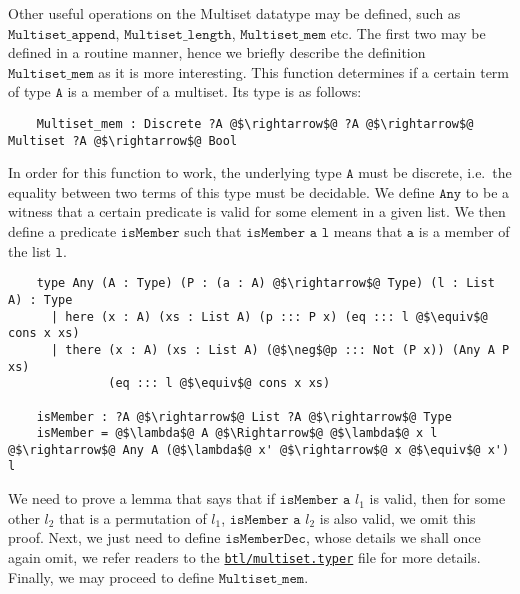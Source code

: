 \documentclass[12pt,twoside,maitrise]{dms}
\theoremstyle{definition}
\numberwithin{equation}{section}
\numberwithin{table}{chapter}
\numberwithin{figure}{chapter}
\newcommand\id[1] {\texttt{#1}}
\newcommand\fn[1] {\texttt{#1}}
\begin{document}
Other useful operations on the Multiset datatype may be defined, such as
$\fn{Multiset\_append}$, $\fn{Multiset\_length}$, $\fn{Multiset\_mem}$ etc. The
first two may be defined in a routine manner, hence we briefly describe the
definition $\fn{Multiset\_mem}$ as it is more interesting. This function
determines if a certain term of type $\fn{A}$ is a member of a multiset. Its
type is as follows:

\begin{verbatim}
    Multiset_mem : Discrete ?A @$\rightarrow$@ ?A @$\rightarrow$@ Multiset ?A @$\rightarrow$@ Bool
\end{verbatim}

In order for this function to work, the underlying type $\fn{A}$ must be
discrete, i.e.\ the equality between two terms of this type must be decidable.
We define $\fn{Any}$ to be a witness that a certain predicate is valid for some
element in a given list. We then define a predicate $\fn{isMember}$ such that
$\fn{isMember a l}$ means that $\fn{a}$ is a member of the list $\fn{l}$.

\begin{verbatim}
    type Any (A : Type) (P : (a : A) @$\rightarrow$@ Type) (l : List A) : Type
      | here (x : A) (xs : List A) (p ::: P x) (eq ::: l @$\equiv$@ cons x xs)
      | there (x : A) (xs : List A) (@$\neg$@p ::: Not (P x)) (Any A P xs)
              (eq ::: l @$\equiv$@ cons x xs)

    isMember : ?A @$\rightarrow$@ List ?A @$\rightarrow$@ Type
    isMember = @$\lambda$@ A @$\Rightarrow$@ @$\lambda$@ x l @$\rightarrow$@ Any A (@$\lambda$@ x' @$\rightarrow$@ x @$\equiv$@ x') l
\end{verbatim}

We need to prove a lemma that says that if $\fn{isMember a $l_1$}$ is valid,
then for some other $\fn{$l_2$}$ that is a permutation of $\fn{$l_1$}$,
$\fn{isMember a $l_2$}$ is also valid, we omit this proof. Next, we just need to
define $\fn{isMemberDec}$, whose details we shall once again omit, we refer
readers to the
\href{https://gitlab.com/jamestjw/typer/-/blob/quot-types-v1.0.0/btl/multiset.typer}{\id{btl/multiset.typer}}
file for more details. Finally, we may proceed to define $\fn{Multiset\_mem}$.
\end{document}
